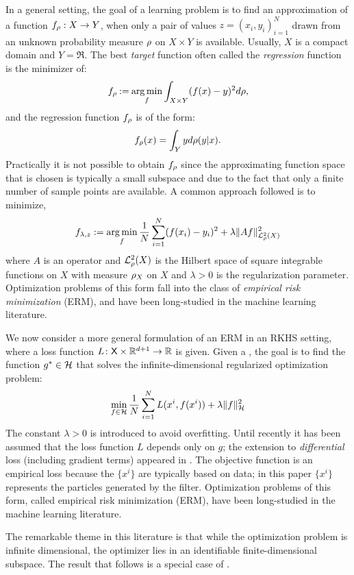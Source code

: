 In a general setting, the goal of a learning problem is to find an approximation of a function $f_\rho : X \to Y$, when only a pair of values $z = (x_i, y_i)_{i=1}^N$ drawn from an unknown probability measure $\rho$ on $X \times Y$ is available. Usually, $X$ is a compact domain and $Y = \Re$. The best \textit{target} function often called the \textit{regression} function is the minimizer of:
\[
f_\rho \mathbin{:=} \mathop{\rm arg{\,}min}_f \int_{X \times Y} (f(x) - y) ^2 d\rho,
\]
and the regression function $f_\rho$ is of the form:
\begin{equation}
f_\pr(x) = \int_Y y d\pr(y|x).
\label{eq:f_rho}
\end{equation}
Practically it is not possible to obtain $f_\rho$ since the approximating function space that is chosen is typically a small subspace and due to the fact that only a finite number of sample points are available.
A common approach followed is to minimize,
\[
f_{\lambda,z} := \mathop{\rm arg{\,}min}_f \frac{1}{N}\sum_{i=1}^N (f(x_i) - y_i)^2 + \lambda \|A f \|^2_{\mathcal{L}_{\rho}^2(X)}
\]
where $A$ is an operator and $\mathcal{L}^2_{\rho}(X)$ is the Hilbert space of square integrable functions on $X$ with measure $\rho_X$ on $X$ and $\lambda>0$ is the regularization parameter. Optimization problems of this form fall into the class of \textit{empirical risk minimization} (ERM), and have been long-studied in the machine learning literature.   

We now consider a more general formulation of an ERM in an RKHS setting, where a loss function $L \colon  {\sf X}\times \mathbb{R}^{d+1}\to\mathbb{R}$ is given.   Given a ,   the goal is to find the function $g^*\in{\cal H}$ that solves the infinite-dimensional regularized optimization problem:
\begin{equation}
\min_{f\in\clH} \frac{1}{N} \sum_{i=1}^N L(x^i,  f(x^i))     + \lambda \| f\|^2_{\clH}
\label{e:RKHS_opt}
\end{equation}
The constant $\lambda>0$ is introduced to avoid overfitting.  Until recently it has been assumed that
the loss function
$L$ depends only on $g$;  the extension to \textit{differential} loss (including gradient terms) appeared in \cite{zho08}.    The objective function is an empirical loss  because the $\{x^i\}$ are typically based on data; in this paper $\{x^i\}$  represents the particles generated by the filter. Optimization problems of this form, called empirical risk minimization (ERM), have been long-studied in the machine learning literature.

The remarkable theme in this literature is that while the optimization problem is infinite dimensional,  the optimizer lies in an identifiable finite-dimensional subspace.
The result that follows is a special case of  \cite[Theorem~2]{zho08}.


